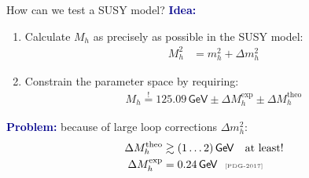 \documentclass[hyperref={pdfpagelabels=false},ngerman]{beamer}
\newcommand{\eh}[1]{\,\mathsf{#1}}
\newcommand{\mycite}[1]{\ensuremath{\text{\textcolor{darkgray}{\tiny [#1]}}}}
\renewcommand{\emph}[1]{\textbf{\textcolor{darkblue}{#1}}}
\newcommand{\GeV}{\eh{GeV}}
\begin{document}


\begin{frame}{How can we test a SUSY model?}
  \emph{Idea:}
  \begin{enumerate}
  \item Calculate $M_h$ as precisely as possible in the SUSY model:
  \begin{align*}
    M_h^2 &= m_h^2 + \Delta m_h^2
  \end{align*}
  \item Constrain the parameter space by requiring:
    \begin{align*}
      M_h \overset{!}{=} 125.09 \GeV \pm \Delta M_h^{\text{exp}} \pm \Delta M_h^{\text{theo}}
    \end{align*}
  \end{enumerate}
  \emph{Problem:} because of large loop corrections $\Delta m_h^2$:
  \begin{align*}
    \Delta M_h^{\text{theo}} &\gtrsim (1\ldots 2)\eh{GeV} \quad \text{at least!} \\
    \Delta M_h^{\text{exp}} &= 0.24\eh{GeV} \ \ \mycite{PDG-2017}
  \end{align*}
\end{frame}
\end{document}
